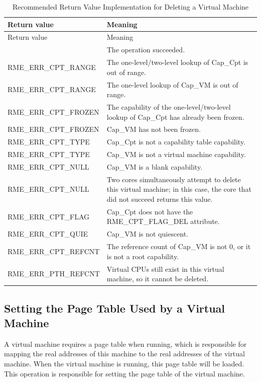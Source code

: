 \begin{xltabular}{\textwidth}{@{}>{\hsize\raggedright\arraybackslash}X>{\hsize\raggedright\arraybackslash}X@{}}
\caption{Recommended Return Value Implementation for Deleting a Virtual Machine}\label{tab:8-76-delete-virtual-machine-suggested-return-values}\\
\toprule
Return value & Meaning\tabularnewline
\endfirsthead
\toprule
Return value & Meaning\tabularnewline
\midrule
\endhead
\bottomrule
{} & The operation succeeded.\tabularnewline
    RME\_ERR\_CPT\_RANGE & The one-level/two-level lookup of Cap\_Cpt is out of range.\tabularnewline
    RME\_ERR\_CPT\_RANGE & The one-level lookup of Cap\_VM is out of range.\tabularnewline
    RME\_ERR\_CPT\_FROZEN & The capability of the one-level/two-level lookup of Cap\_Cpt has already been frozen.\tabularnewline
    RME\_ERR\_CPT\_FROZEN & Cap\_VM has not been frozen.\tabularnewline
    RME\_ERR\_CPT\_TYPE & Cap\_Cpt is not a capability table capability.\tabularnewline
    RME\_ERR\_CPT\_TYPE & Cap\_VM is not a virtual machine capability.\tabularnewline
    RME\_ERR\_CPT\_NULL & Cap\_VM is a blank capability.\tabularnewline
    RME\_ERR\_CPT\_NULL & Two cores simultaneously attempt to delete this virtual machine; in this case, the core that did not succeed returns this value.\tabularnewline
    RME\_ERR\_CPT\_FLAG & Cap\_Cpt does not have the RME\_CPT\_FLAG\_DEL attribute.\tabularnewline
    RME\_ERR\_CPT\_QUIE & Cap\_VM is not quiescent.\tabularnewline
    RME\_ERR\_CPT\_REFCNT & The reference count of Cap\_VM is not 0, or it is not a root capability.\tabularnewline
    RME\_ERR\_PTH\_REFCNT & Virtual CPUs still exist in this virtual machine, so it cannot be deleted.\tabularnewline
\end{xltabular}
\nopagebreak[4]

\subsection{Setting the Page Table Used by a Virtual Machine}\label{subsec:8-set-virtual-machine-page-table}

A virtual machine requires a page table when running, which is responsible for mapping the real addresses of this machine to the real addresses of the virtual machine. When the virtual machine is running, this page table will be loaded. This operation is responsible for setting the page table of the virtual machine.


